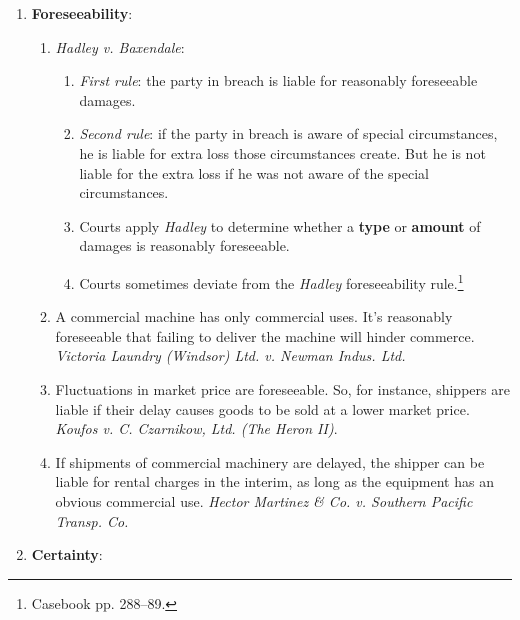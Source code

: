 \begin{enumerate}
\begin{enumerate}
        prove specific losses. \emph{Redgrave v. Boston Symphony Orchestra, 
        Inc.}\footnote{Squibbed on casebook pp. 276--77.}
        \item English courts have allowed recovery for loss of opportunity to 
        appear before the public, but American courts have not, absent 
        evidence of specific losses.
    \end{enumerate}
    \item \textbf{Foreseeability}:
    \begin{enumerate}
        \item \emph{Hadley v. Baxendale}:
        \begin{enumerate}
            \item \emph{First rule}: the party in breach is liable for 
            reasonably foreseeable damages.
            \item \emph{Second rule}: if the party in breach is aware of 
            special circumstances, he is liable for extra loss those 
            circumstances create. But he is not liable for the extra loss if 
            he was not aware of the special circumstances.
            \item Courts apply \emph{Hadley} to determine whether a 
            \textbf{type} or \textbf{amount} of damages is reasonably 
            foreseeable.
            \item Courts sometimes deviate from the \emph{Hadley} 
            foreseeability rule.\footnote{Casebook pp. 288--89.}
        \end{enumerate}
        \item A commercial machine has only commercial uses. It's reasonably 
        foreseeable that failing to deliver the machine will hinder commerce. 
        \emph{Victoria Laundry (Windsor) Ltd. v. Newman Indus. Ltd.}
        \item Fluctuations in market price are foreseeable. So, for instance, 
        shippers are liable if their delay causes goods to be sold at a lower 
        market price. \emph{Koufos v. C. Czarnikow, Ltd. (The Heron II)}.
        \item If shipments of commercial machinery are delayed, the shipper 
        can be liable for rental charges in the interim, as long as the 
        equipment has an obvious commercial use. \emph{Hector Martinez \& Co. 
        v. Southern Pacific Transp. Co.}
    \end{enumerate}
    \item \textbf{Certainty}:

\end{enumerate}
